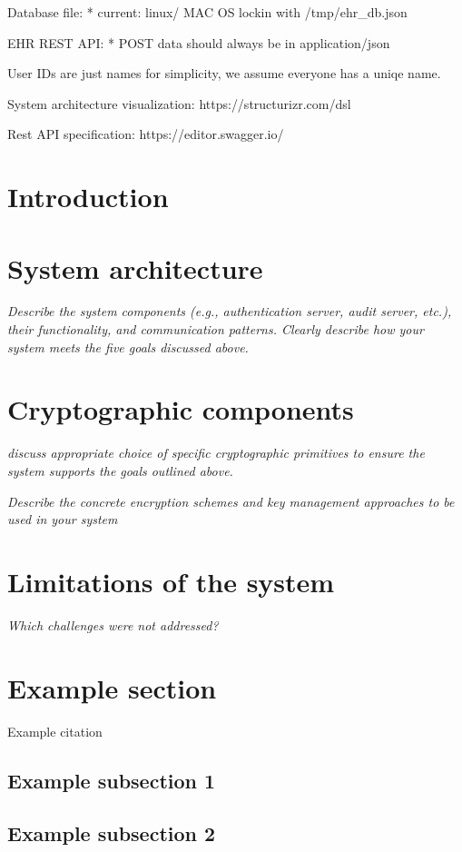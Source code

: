 \documentclass[11pt]{article}
\begin{document}
\begin{flushleft}
		Database file:
		* current: linux/ MAC OS lockin with /tmp/ehr_db.json

		EHR REST API:
		* POST data should always be in application/json

		User IDs are just names for simplicity, we assume everyone has a uniqe name.

		System architecture visualization: https://structurizr.com/dsl

		Rest API specification: https://editor.swagger.io/
		
		\section{Introduction}

		\section{System architecture}

		\textit{Describe the system components (e.g., authentication server, audit server, etc.), their functionality, and communication patterns. Clearly describe how your system meets the five goals discussed above.}

		\section{Cryptographic components}

		\textit{discuss appropriate choice of specific cryptographic primitives to ensure the system supports the goals outlined above.}

		\textit{Describe the concrete encryption schemes and key management approaches to be used in your system}

		\section{Limitations of the system}

		\textit{Which challenges were not addressed?}
		
		\section{Example section}
		
		Example citation \cite{neuman2009challenges}
		
		\subsection{Example subsection 1}
		
		\subsection{Example subsection 2}
		
		\newpage
		
		
		
		
		
		
	\end{flushleft}
	
\end{document}
